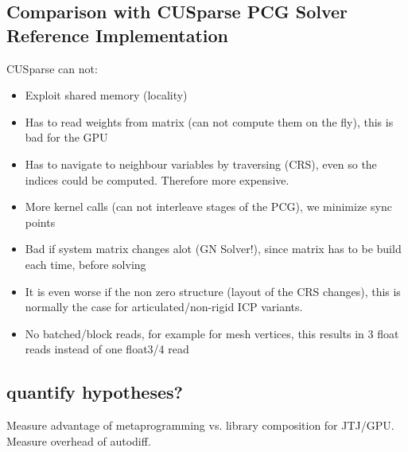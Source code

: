 
\subsection{Comparison with CUSparse PCG Solver Reference Implementation}

CUSparse can not:
\begin{itemize}
\item Exploit shared memory (locality)
\item Has to read weights from matrix (can not compute them on the fly), this is bad for the GPU
\item Has to navigate to neighbour variables by traversing (CRS), even so the indices could be computed. Therefore more expensive.
\item More kernel calls (can not interleave stages of the PCG), we minimize sync points
\item Bad if system matrix changes alot (GN Solver!), since matrix has to be build each time, before solving
\item It is even worse if the non zero structure (layout of the CRS changes), this is normally the case for articulated/non-rigid ICP variants.
\item No batched/block reads, for example for mesh vertices, this results in 3 float reads instead of one float3/4 read
\end{itemize}

\subsection{quantify hypotheses?}
Measure advantage of metaprogramming vs. library composition for JTJ/GPU.
Measure overhead of autodiff.
